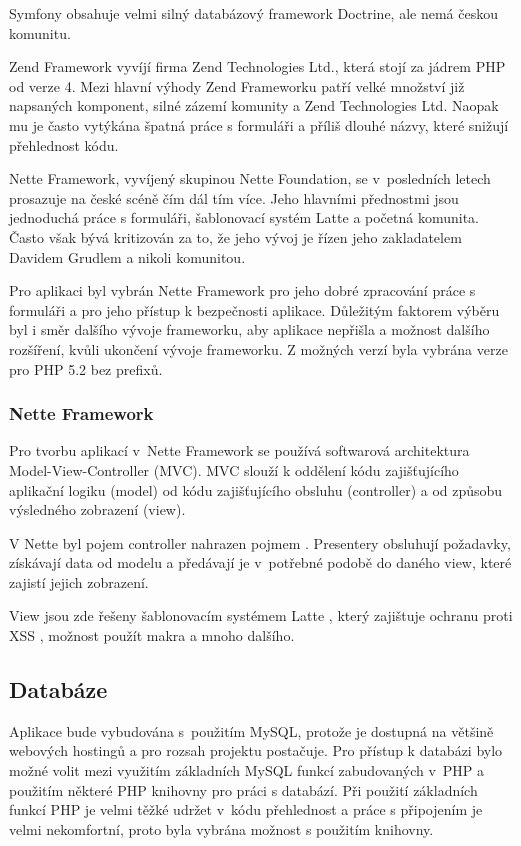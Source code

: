 \documentclass[thesis=B,czech]{FITthesis}[2011/06/14]
\begin{document}
Symfony obsahuje velmi silný databázový framework Doctrine, ale nemá českou komunitu.

Zend Framework vyvíjí firma Zend Technologies Ltd., která stojí za jádrem PHP od verze 4. Mezi hlavní výhody Zend Frameworku patří velké množství již napsaných komponent, silné zázemí komunity a Zend Technologies Ltd. Naopak mu je často vytýkána špatná práce s formuláři a příliš dlouhé názvy, které snižují přehlednost kódu. 

Nette Framework, vyvíjený skupinou Nette Foundation, se v~posledních letech prosazuje na české scéně čím dál tím více. Jeho hlavními přednostmi jsou jednoduchá práce s formuláři, šablonovací systém Latte a početná komunita. Často však bývá kritizován za to, že jeho vývoj je řízen jeho zakladatelem Davidem Grudlem a nikoli komunitou.

Pro aplikaci byl vybrán Nette Framework pro jeho dobré zpracování práce s formuláři a pro jeho přístup k bezpečnosti aplikace. Důležitým faktorem výběru byl i směr dalšího vývoje frameworku, aby aplikace nepřišla a možnost dalšího rozšíření, kvůli ukončení vývoje frameworku. Z možných verzí byla vybrána verze pro PHP 5.2 bez prefixů.

\subsubsection*{Nette Framework}\label{netteDescription}
Pro tvorbu aplikací v~Nette Framework se používá softwarová architektura Model-View-Controller (MVC). MVC slouží k oddělení kódu zajišťujícího aplikační logiku (model) od kódu zajišťujícího obsluhu (controller) a od způsobu výsledného zobrazení (view).

 \cite{netteModel}

V Nette byl pojem controller nahrazen pojmem . Presentery obsluhují požadavky, získávají data od modelu a předávají je v~potřebné podobě do daného view, které zajistí jejich zobrazení.

View jsou zde řešeny šablonovacím systémem Latte \cite{latte}, který zajištuje ochranu proti XSS \cite{xss}, možnost použít makra a mnoho dalšího.

\subsection{Databáze}
Aplikace bude vybudována s~použitím MySQL, protože je dostupná na většině webových hostingů a pro rozsah projektu postačuje. Pro přístup k databázi bylo možné volit mezi využitím základních MySQL funkcí zabudovaných v~PHP a použitím některé PHP knihovny pro práci s databází. Při použití základních funkcí PHP je velmi těžké udržet v~kódu přehlednost a práce s připojením je velmi nekomfortní, proto byla vybrána možnost s použitím knihovny.
\end{document}
